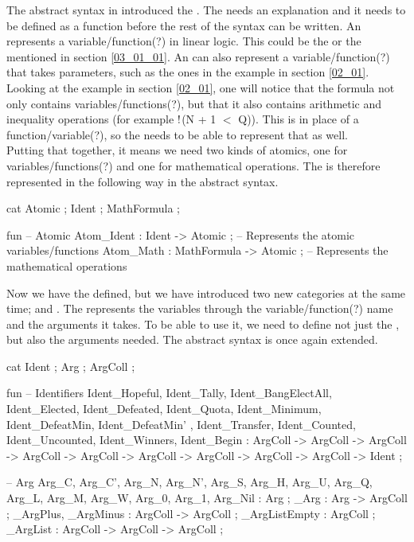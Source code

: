 The abstract syntax in  introduced the . The  needs an explanation and it needs to be defined as a function before the rest of the syntax can be written. An  represents a variable/function(?) in linear logic. This could be the  or the  mentioned in section \ref{03_01_01}. An  can also represent a variable/function(?) that takes parameters, such as the ones in the example in section \ref{02_01}. \\
Looking at the example in section \ref{02_01}, one will notice that the formula not only contains variables/functions(?), but that it also contains arithmetic and inequality operations (for example  $\mathord{\text{\rm !}}$(N + 1 $<$ Q)). This is in place of a function/variable(?), so the  needs to be able to represent that as well. \\
Putting that together, it means we need two kinds of atomics, one for variables/functions(?) and one for mathematical operations. The  is therefore represented in the following way in the abstract syntax.

\begin{lstgf}
    cat
        Atomic ; Ident ; MathFormula ;

    fun
        -- Atomic
        Atom_Ident : Ident -> Atomic ;          -- Represents the atomic variables/functions
        Atom_Math : MathFormula -> Atomic ;     -- Represents the mathematical operations
\end{lstgf}

Now we have the  defined, but we have introduced two new categories at the same time;  and . The  represents the variables through the variable/function(?) name and the arguments it takes. To be able to use it, we need to define not just the , but also the arguments needed. The abstract syntax is once again extended.

\begin{lstgf}
    cat
        Ident ; Arg ; ArgColl ;

    fun
        -- Identifiers
        Ident_Hopeful, Ident_Tally, Ident_BangElectAll, Ident_Elected, Ident_Defeated, Ident_Quota, Ident_Minimum, 
	Ident_DefeatMin, Ident_DefeatMin' , Ident_Transfer, Ident_Counted, Ident_Uncounted, Ident_Winners, Ident_Begin 
	: ArgColl -> ArgColl -> ArgColl -> ArgColl -> ArgColl -> ArgColl -> ArgColl -> ArgColl -> ArgColl -> Ident ;
        
        -- Arg
        Arg_C, Arg_C', Arg_N, Arg_N', Arg_S, Arg_H, Arg_U, Arg_Q, Arg_L, Arg_M, Arg_W, Arg_0, Arg_1, Arg_Nil 
	: Arg ;
        _Arg : Arg -> ArgColl ;
        _ArgPlus, _ArgMinus : ArgColl -> ArgColl ;
        _ArgListEmpty : ArgColl ;
        _ArgList : ArgColl -> ArgColl ->  ArgColl ;
\end{lstgf}

